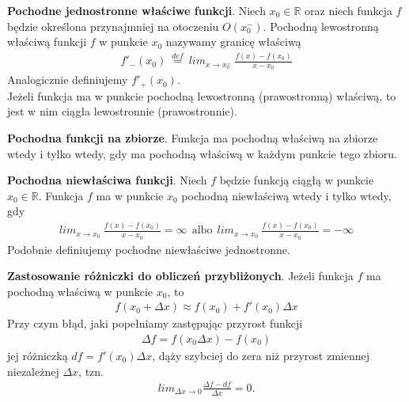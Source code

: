 \documentclass[12pt]{article}
\begin{document}
    \begin{definition}
        \textbf{Pochodne jednostronne właściwe funkcji}. Niech $x_0 \in \mathbb{R}$ oraz niech funkcja $f$ będzie
        określona przynajmniej na otoczeniu  $O(x^{-}_0)$. Pochodną lewostronną właściwą funkcji $f$ w punkcie $x_0$
        nazywamy granicę właściwą
        \begin{align*}
            f'_{-}(x_0) ~ \stackrel{def}{=} ~ lim_{x \rightarrow x^{-}_0} ~ \frac{f(x) - f(x_0)}{x - x_0}
        \end{align*}
        Analogicznie definiujemy $f'_{+}(x_0)$.\\

        Jeżeli funkcja ma w punkcie pochodną lewostronną (prawostronną) właściwą, to jest w nim ciągła lewostronnie
        (prawostronnie).
    \end{definition}

    \begin{definition}
        \textbf{Pochodna funkcji na zbiorze}. Funkcja ma pochodną właściwą na zbiorze wtedy i tylko wtedy, gdy ma pochodną
        właściwą w każdym punkcie tego zbioru.
    \end{definition}

    \begin{definition}
        \textbf{Pochodna niewłaściwa funkcji}. Niech $f$ będzie funkcją ciągłą w punkcie $x_0 \in \mathbb{R}$. Funkcja
        $f$ ma w punkcie $x_0$ pochodną niewłaściwą wtedy i tylko wtedy, gdy
        \begin{align*}
            lim_{x \rightarrow  x_0} ~ \frac{f(x) - f(x_0)}{x - x_0} = \infty ~~ \text{albo} ~~ lim_{x  \rightarrow x_0} ~ \frac{f(x) - f(x_0)}{x - x_0} = -\infty
        \end{align*}
        Podobnie definiujemy pochodne niewłaściwe jednostronne.
    \end{definition}

    \begin{theorem}
        \textbf{Zastosowanie różniczki do obliczeń przybliżonych}. Jeżeli funkcja $f$ ma pochodną właściwą w punkcie
        $x_0$, to
        \begin{align*}
            f(x_0 + \Delta x) \approx f(x_0) + f'(x_0)\Delta x
        \end{align*}
        Przy czym błąd, jaki popełniamy zastępując przyrost funkcji
        \begin{align*}
            \Delta f = f(x_0 \Delta x) - f(x_0)
        \end{align*}
        jej różniczką $df = f'(x_0)\Delta x$, dąży szybciej do zera niż przyrost zmiennej niezależnej $\Delta x$, tzn.
        \begin{align*}
            lim_{\Delta  x  \rightarrow 0} \frac{\Delta f - df}{\Delta  x} = 0.
        \end{align*}
    \end{theorem}
\end{document}

